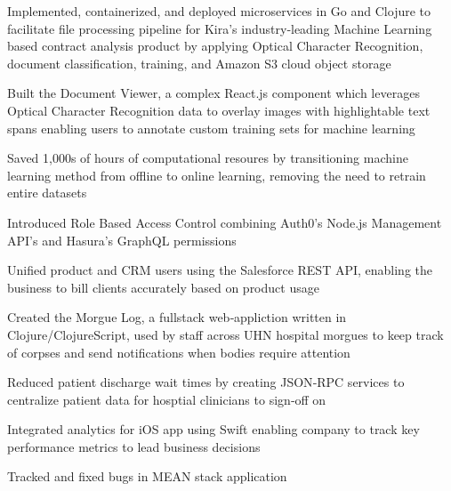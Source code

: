 \documentclass[]{resume}
\begin{document}
\begin{minipage}[t]{0.69\textwidth}
\separatorS
\begin{tightemize}
\item Implemented, containerized, and deployed microservices in Go and Clojure to facilitate file processing pipeline for Kira’s industry‑leading Machine Learning based contract analysis product by applying Optical Character Recognition, document classification, training, and Amazon S3 cloud object storage
\item Built the Document Viewer, a complex React.js component which leverages Optical Character Recognition data to overlay images with highlightable text spans enabling users to annotate custom training sets for machine learning
\item Saved 1,000s of hours of computational resoures by transitioning machine learning method from offline to online learning, removing the need to retrain entire datasets
\item Introduced Role Based Access Control combining Auth0's Node.js Management API's and Hasura's GraphQL permissions
\item  Unified product and CRM users using the Salesforce REST API, enabling the business to bill clients accurately based on product usage
\end{tightemize}
\separatorM

\separatorS
\begin{tightemize}
\item Created the Morgue Log, a fullstack web‑appliction written in Clojure/ClojureScript, used by staff across UHN hospital morgues to keep track of corpses and send notifications when bodies require attention
\item Reduced patient discharge wait times by creating JSON‑RPC services to centralize patient data for hosptial clinicians to sign‑off on
\end{tightemize}
\separatorM

\separatorS
\begin{tightemize}
\item Integrated analytics for iOS app using Swift enabling company to track key performance metrics to lead business decisions
\item Tracked and fixed bugs in MEAN stack application
\end{tightemize}
 

\end{minipage}
\end{document}
